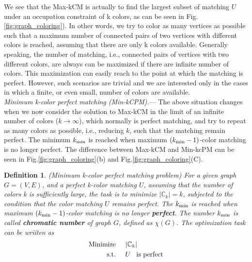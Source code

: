 \documentclass[%
 reprint,
nofootinbib,
 amsmath,amssymb,
 aps,
floatfix,
]{revtex4-2}
\newtheorem{definition}{Definition}
\begin{document}
We see that the Max-kCM is actually to find the largest subset of matching $U$ under an occupation constraint of k colors, as can be seen in Fig.\ref{fig:graph_coloring}). In other words, we try to color as many vertices as possible such that a maximum number of connected pairs of two vertices with different colors is reached, assuming that there are only k colors available. Generally speaking, the number of matching, i.e., connected pairs of vertices with two different colors, are always can be maximized if there are infinite number of colors. This maximization can easily reach to the point at which the matching is perfect. However, such scenarios are trivial and we are interested only in the cases in which a finite, or even small, number of colors are available.\\

\emph{Minimum k-color perfect matching {\rm (Min-kCPM)}.}---  The above situation changes when we now consider the solution to Max-kCM in the limit of an infinite number of colors ($k \to \infty$), which normally is perfect matching, and try to repeat as many colors as possible, i.e., reducing $k$,  such that the matching remain perfect. The minimum $k_{\rm min}$ is reached when maximum $(k_{\rm min}-1)$-color matching is no longer perfect. The difference between Max-kCM and Min-kcPM can be seen in Fig.\ref{fig:graph_coloring}(b) and Fig.\ref{fig:graph_coloring}(C).
\begin{definition}
\label{def:minimum-k-color-perfect-matching-problem}
{\rm (Minimum k-color perfect matching problem)} For a given graph $G=(V,E)$, and a perfect k-color matching $U$, assuming that the number of colors k is sufficiently large, the task is to minimize $|\mathbb{C}_k| = k$, subjected to the condition that the color matching $U$ remains perfect. The $k_{\rm min}$ is reached when maximum $(k_{\rm min}-1)$-color matching is no longer {\rm \textbf{perfect}}. The number $k_{\rm min}$ is called {\rm \textbf{chromatic number}} of graph $G$, defined as $\chi(G)$. The optimization task can be wriiten as 
\begin{align}\label{eq-min-kcpm}
\text{\rm Minimize} \hspace{5mm} &|\mathbb{C}_k|  \nonumber \\
\text{\rm s.t.} \hspace{5mm} &U \hspace{3mm} \text{\rm is perfect}
\end{align}
\end{definition}
\end{document}
